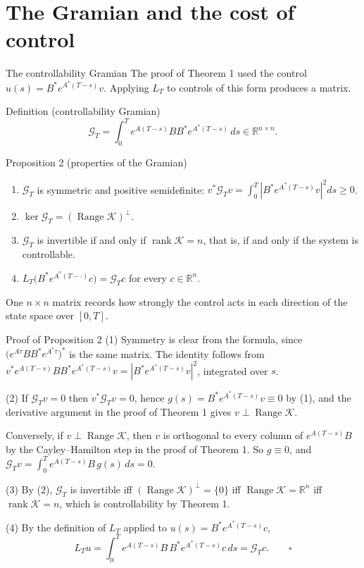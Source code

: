 \documentclass[10pt]{beamer}
\newcommand{\R}{\mathbb{R}}
\newcommand{\Kal}{\mathcal{K}}
\newcommand{\Gram}{\mathcal{G}}
\DeclareMathOperator{\Range}{Range}
\DeclareMathOperator{\rank}{rank}
\begin{document}


\section{The Gramian and the cost of control}

\begin{frame}{The controllability Gramian}
\small
The proof of Theorem 1 used the control $u(s)=B^*e^{A^*(T-s)}v$. Applying $L_T$ to controls of this form produces a matrix.
\begin{mathbox}{Definition (controllability Gramian)}
\[
\Gram_T=\int_0^Te^{A(T-s)}BB^*e^{A^*(T-s)}\,ds\in\R^{n\times n}.
\]
\end{mathbox}
\begin{mathbox}{Proposition 2 (properties of the Gramian)}
\begin{enumerate}
\item $\Gram_T$ is symmetric and positive semidefinite: $v^*\Gram_Tv=\int_0^T|B^*e^{A^*(T-s)}v|^2ds\ge0$.
\item $\ker\Gram_T=(\Range\Kal)^\perp$.
\item $\Gram_T$ is invertible if and only if $\rank\Kal=n$, that is, if and only if the system is controllable.
\item $L_T\big(B^*e^{A^*(T-\cdot)}c\big)=\Gram_Tc$ for every $c\in\R^n$.
\end{enumerate}
\end{mathbox}
One $n\times n$ matrix records how strongly the control acts in each direction of the state space over $[0,T]$.
\end{frame}


\begin{frame}{Proof of Proposition 2}
\small
\alert{(1)} Symmetry is clear from the formula, since $\big(e^{A\tau}BB^*e^{A^*\tau}\big)^*$ is the same matrix. The identity follows from $v^*e^{A(T-s)}BB^*e^{A^*(T-s)}v=|B^*e^{A^*(T-s)}v|^2$, integrated over $s$.

\medskip
\alert{(2)} If $\Gram_Tv=0$ then $v^*\Gram_Tv=0$, hence $g(s)=B^*e^{A^*(T-s)}v\equiv0$ by (1), and the derivative argument in the proof of Theorem 1 gives $v\perp\Range\Kal$.

Conversely, if $v\perp\Range\Kal$, then $v$ is orthogonal to every column of $e^{A(T-s)}B$ by the Cayley--Hamilton step in the proof of Theorem 1. So $g\equiv0$, and $\Gram_Tv=\int_0^Te^{A(T-s)}B\,g(s)\,ds=0$.

\medskip
\alert{(3)} By (2), $\Gram_T$ is invertible iff $(\Range\Kal)^\perp=\{0\}$ iff $\Range\Kal=\R^n$ iff $\rank\Kal=n$, which is controllability by Theorem 1.

\medskip
\alert{(4)} By the definition of $L_T$ applied to $u(s)=B^*e^{A^*(T-s)}c$,
\[
L_Tu=\int_0^Te^{A(T-s)}B\,B^*e^{A^*(T-s)}c\,ds=\Gram_Tc . \qquad\square
\]
\end{frame}
\end{document}

